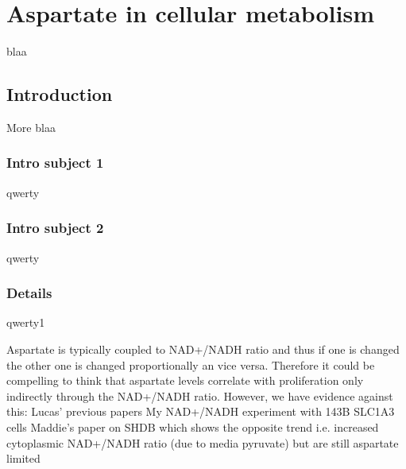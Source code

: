 \chapter{Aspartate in cellular metabolism}
blaa

\section{Introduction}
More blaa

\subsection{Intro subject 1}
qwerty

\subsection{Intro subject 2}
qwerty
\subsection{Details}
qwerty1




Aspartate is typically coupled to NAD+/NADH ratio and thus if one is changed the other one is changed proportionally an vice versa.
Therefore it could be compelling to think that aspartate levels correlate with proliferation only indirectly through the NAD+/NADH ratio.
However, we have evidence against this:
Lucas' previous papers
My NAD+/NADH experiment with 143B SLC1A3 cells
Maddie's paper on SHDB which shows the opposite trend i.e. increased cytoplasmic NAD+/NADH ratio (due to media pyruvate) but are still aspartate limited






